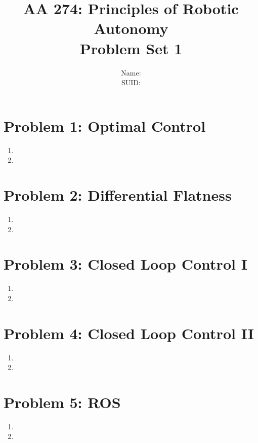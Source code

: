 \documentclass{article}
\title{AA 274: Principles of Robotic Autonomy \\ Problem Set 1}
\author{Name:      \\ SUID:}
\date{}
\begin{document}
\maketitle
\pagestyle{fancy} 

\section*{Problem 1: Optimal Control}
\begin{enumerate}[label=(\roman*)]
\item
\item

\end{enumerate}


\section*{Problem 2: Differential Flatness}
\begin{enumerate}[label=(\roman*)]
\item
\item

\end{enumerate}

\section*{Problem 3: Closed Loop Control I}
\begin{enumerate}[label=(\roman*)]
\item
\item

\end{enumerate}

\section*{Problem 4: Closed Loop Control II}
\begin{enumerate}[label=(\roman*)]
\item
\item

\end{enumerate}

\section*{Problem 5: ROS}
\begin{enumerate}[label=(\roman*)]
\item
\item

\end{enumerate}
\end{document}
